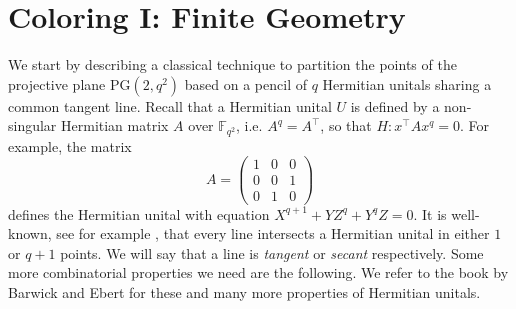 \documentclass[12pt]{article}
\newcommand{\PG}{\mathrm{PG}}
\theoremstyle{definition}
\begin{document}
	\fi
	\section{Coloring I: Finite Geometry}\label{sec:pencilunitals}
	We start by describing a classical technique to partition the points of the projective plane $\PG(2,q^2)$ based on a pencil of $q$ Hermitian unitals sharing a common tangent line. Recall that a Hermitian unital $U$ is defined by a non-singular Hermitian matrix $A$ over $\mathbb{F}_{q^2}$, i.e. $A^q = A^\top$, so that $H:x^\top A x^q = 0$. For example, the matrix 
	\[A = \begin{pmatrix} 1 & 0 & 0 \\ 0 & 0 & 1 \\ 0 & 1 & 0 \end{pmatrix}\]
	defines the Hermitian unital with equation $X^{q+1}+YZ^q+Y^qZ=0$. It is well-known, see for example \cite{BarwickEbert}, that every line intersects a Hermitian unital in either $1$ or $q+1$ points. We will say that a line is \textit{tangent} or \textit{secant} respectively. Some more combinatorial properties we need are the following. We refer to the book by Barwick and Ebert \cite{BarwickEbert} for these and many more properties of Hermitian unitals.
	
\end{document}
